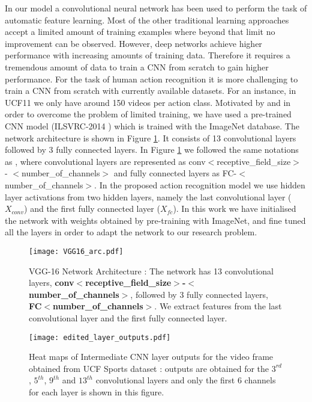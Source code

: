 \documentclass[10pt,twocolumn,letterpaper]{article}
\begin{document}
   In our model a convolutional neural network has been used to perform the task of automatic feature learning. Most of the other traditional learning approaches accept a limited amount of training examples where beyond that limit no improvement can be observed. However, deep networks achieve higher performance with increasing amounts of training data. Therefore it requires a tremendous amount of data to train a CNN from scratch to gain higher performance. For the task of human action recognition it is more challenging to train a CNN from scratch with currently available datasets. For an instance, in UCF11 we only have around 150 videos per action class. Motivated by \cite{Simonyan2014} and in order to overcome the problem of limited training, we have used a pre-trained CNN model (ILSVRC-2014 \cite{VGG16}) which is trained with the ImageNet database. The network architecture is shown in Figure \ref{fig:vgg16}. It consists of 13 convolutional layers followed by 3 fully connected layers. In Figure \ref{fig:vgg16} we followed the same notations as \cite{VGG16} , where convolutional layers are represented as conv$<$receptive\_field\_size$>$ - $<$number\_of\_channels$>$ and  fully connected layers as FC-$<$number\_of\_channels$>$.  In the proposed action recognition model we use hidden layer activations from two hidden layers, namely the last convolutional layer ($X_{conv}$) and the first fully connected layer ($X_{fc}$). In this work we have initialised the network with weights obtained by pre-training with ImageNet, and fine tuned all the layers in order to adapt the network to our research problem. 
   
    \begin{figure}[h]
        \begin{flushleft}
        	\texttt{[image: VGG16\_arc.pdf]}
	\caption{ VGG-16 Network \cite{VGG16}  Architecture : The network has 13 convolutional layers, \textbf{conv$<$receptive\_field\_size$>$-$<$number\_of\_channels$>$}, followed by 3 fully connected layers, \textbf{FC\-$<$number\_of\_channels$>$}. We extract features from the last convolutional layer and the first fully connected layer.}
	\label{fig:vgg16}
        \end{flushleft}
        \vspace{-2 mm}
  \end{figure}

       
    
   \begin{figure}[h]
        \begin{flushleft}
        	\texttt{[image: edited\_layer\_outputs.pdf]}
	\caption{Heat maps of Intermediate CNN layer outputs for the video frame obtained from UCF Sports dataset :  outputs are obtained for the $3^{rd}$, $5^{th}$, $9^{th}$ and $13^{th}$ convolutional layers and only the first 6 channels for each layer is shown in this figure. }
	\label{fig:intermid}
        \end{flushleft}
        \vspace{-7 mm}
  \end{figure}
\end{document}
